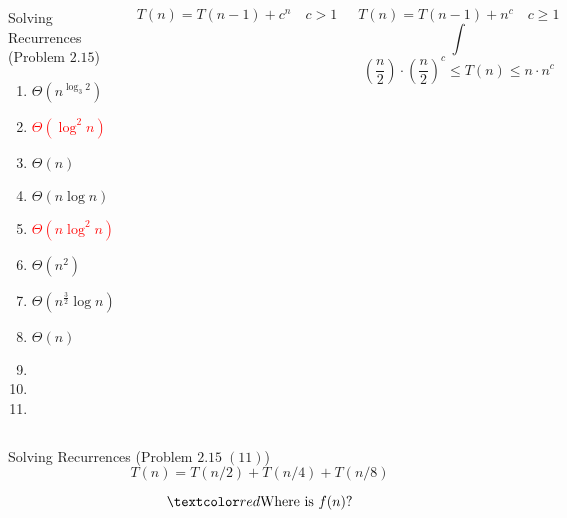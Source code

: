 \begin{frame}{}
  \begin{columns}
      \begin{exampleblock}{Solving Recurrences (Problem $2.15$)}
	\begin{enumerate}[(1)]
	  \item $\Theta(n^{\log_3 2})$
	  \item \textcolor{red}{$\Theta(\log^2 n)$}
	  \item $\Theta(n)$
	  \item $\Theta(n \log n)$
	  \item \textcolor{red}{$\Theta(n \log^2 n)$}
	  \item $\Theta(n^2)$
	  \item $\Theta(n^{\frac{3}{2}}\log n)$
	  \item $\Theta(n)$
	  \item {}
	  \item {}
	  \item \purple{$\cdots$}
	\end{enumerate}
      \end{exampleblock}
      \[
		T(n) = T(n-1) + c^n \quad c > 1
      \]

      \[
		T(n) = T(n-1) + n^c \quad c \ge 1
      \]
	  \pause
	  \[
		\int
	  \]
	  \pause
	  \[
		(\frac{n}{2}) \cdot (\frac{n}{2})^{c} \le T(n) \le n \cdot n^c
	  \]
  \end{columns}
\end{frame}

\begin{frame}[fragile]{}
  \begin{exampleblock}{Solving Recurrences (Problem $2.15\; (11)$)}
    \[
      T(n) = T(n/2) + T(n/4) + T(n/8)
    \]
  \end{exampleblock}

  \pause
  \vspace{0.50cm}
  \[
	\red{\text{Where is } f(n)?}
  \]
\end{frame}

